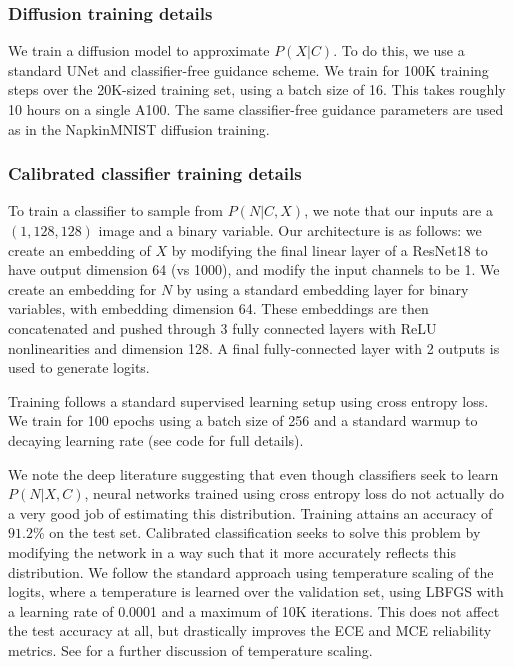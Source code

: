 \documentclass{article}
\theoremstyle{plain}
\theoremstyle{definition}
\theoremstyle{remark}
\begin{document}
	\subsubsection{Diffusion training details}
	We train a diffusion model to approximate $P(X|C)$. To do this, we use a standard UNet and classifier-free guidance scheme. We train for 100K training steps over the 20K-sized training set, using a batch size of 16. This takes roughly 10 hours on a single A100. The same classifier-free guidance parameters are used as in the NapkinMNIST diffusion training.
	
	\subsubsection{Calibrated classifier training details}
	To train a classifier to sample from $P(N|C, X)$, we note that our inputs are a $(1, 128, 128)$ image and a binary variable. Our architecture is as follows: we create an embedding of $X$ by modifying the final linear layer of a ResNet18 to have output dimension 64 (vs 1000), and modify the input channels to be 1. We create an embedding for $N$ by using a standard embedding layer for binary variables, with embedding dimension 64. These embeddings are then concatenated and pushed through 3 fully connected layers with ReLU nonlinearities and dimension 128. A final fully-connected layer with 2 outputs is used to generate logits.
	
	Training follows a standard supervised learning setup using cross entropy loss. We train for 100 epochs using a batch size of 256 and a standard warmup to decaying learning rate (see code for full details). 
	
	We note the deep literature suggesting that even though classifiers seek to learn $P(N|X, C)$, neural networks trained using cross entropy loss do not actually do a very good job of estimating this distribution. Training attains an accuracy of $91.2\%$ on the test set. Calibrated classification seeks to solve this problem by modifying the network in a way such that it more accurately reflects this distribution. We follow the standard approach using temperature scaling of the logits, where a temperature is learned over the validation set, using LBFGS with a learning rate of 0.0001 and a maximum of 10K iterations. This does not affect the test accuracy at all, but drastically improves the ECE and MCE reliability metrics. See \citet{guo2017calibration} for a further discussion of temperature scaling.
	
\end{document}
